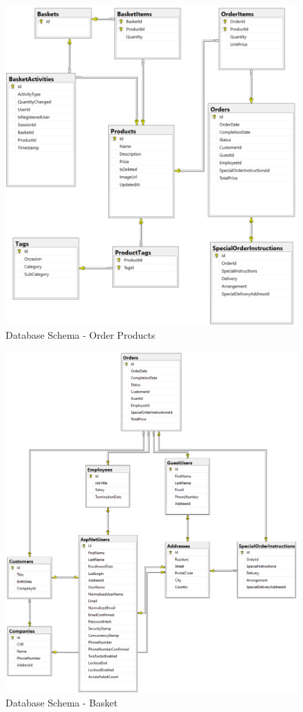 \begin{figure}
    \centering
    \includegraphics[width=1\textwidth]{figures/ssms/erd-order-products.png}
    \caption{Database Schema - Order Products}
    \label{fig:database-schema-order-products}
\end{figure}

\begin{figure}
    \centering
    \includegraphics[width=1\textwidth]{figures/ssms/erd-users.png}
    \caption{Database Schema - Basket}
    \label{fig:database-schema-basket}
\end{figure}

